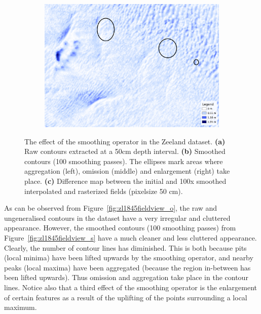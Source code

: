 \begin{figure}
\begin{subfigure}[b]{0.6\linewidth}
    \centering
    \includegraphics[width=\textwidth]{figs/zl1845fieldview_raster_d.pdf}
    \caption{}\label{fig:zl1845fieldview_raster_d}
  \end{subfigure}
  \quad
  \caption{The effect of the smoothing operator in the Zeeland dataset. \textbf{(a)} Raw contours extracted at a 50cm depth interval. \textbf{(b)} Smoothed contours (100 smoothing passes). The ellipses mark areas where aggregation (left), omission (middle) and enlargement (right) take place. \textbf{(c)} Difference map between the initial and 100x smoothed interpolated and rasterized fields (pixelsize 50 cm).}
\label{fig:zl1845fieldview}
\end{figure}
As can be observed from Figure~\ref{fig:zl1845fieldview_o}, the raw and ungeneralised contours in the dataset have a very irregular and cluttered appearance. 
However, the smoothed contours (100 smoothing passes) from Figure~\ref{fig:zl1845fieldview_s} have a much cleaner and less cluttered appearance. 
Clearly, the number of contour lines has diminished. 
This is both because pits (local minima) have been lifted upwards by the smoothing operator, and nearby peaks (local maxima) have been aggregated (because the region in-between has been lifted upwards). 
Thus omission and aggregation take place in the contour lines.
Notice also that a third effect of the smoothing operator is the enlargement of certain features as a result of the uplifting of the points surrounding a local maximum. 

